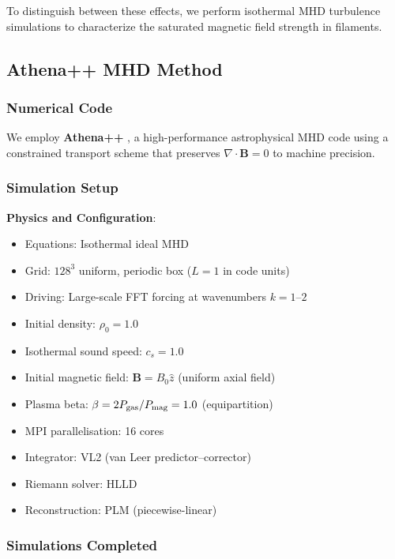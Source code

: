 \documentclass[11pt,a4paper]{article}
\begin{document}
To distinguish between these effects, we perform isothermal MHD turbulence simulations to characterize the saturated magnetic field strength in filaments.

\subsection{Athena++ MHD Method}

\subsubsection{Numerical Code}

We employ \textbf{Athena++} \citep{Stone2020}, a high-performance astrophysical MHD code using a constrained transport scheme that preserves $\nabla \cdot \mathbf{B} = 0$ to machine precision.

\subsubsection{Simulation Setup}

\textbf{Physics and Configuration}:
\begin{itemize}
    \item Equations: Isothermal ideal MHD
    \item Grid: $128^3$ uniform, periodic box ($L = 1$ in code units)
    \item Driving: Large-scale FFT forcing at wavenumbers $k = 1$--$2$
    \item Initial density: $\rho_0 = 1.0$
    \item Isothermal sound speed: $c_s = 1.0$
    \item Initial magnetic field: $\mathbf{B} = B_0 \hat{z}$ (uniform axial field)
    \item Plasma beta: $\beta = 2P_{\rm gas}/P_{\rm mag} = 1.0$ (equipartition)
    \item MPI parallelisation: 16 cores
    \item Integrator: VL2 (van Leer predictor--corrector)
    \item Riemann solver: HLLD
    \item Reconstruction: PLM (piecewise-linear)
\end{itemize}

\subsubsection{Simulations Completed}
\end{document}
